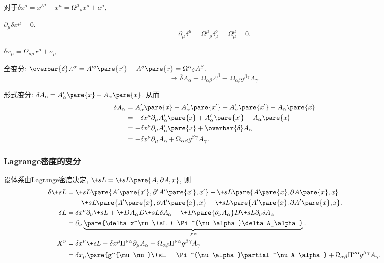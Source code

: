 \documentclass[hidelinks]{ctexart}
\begin{document}
\begin{cenum}
    \item 对于$\delta x^\mu = x'^\mu - x^\mu = {\Omega^\mu}_\rho x^\rho + a^\mu$,
    \begin{cenum}
        \item $\partial_\mu \delta x^\mu = 0$.
        \[ \partial_\mu \delta^\mu = {\Omega^\mu}_\rho \delta^\rho_\mu = \Omega^\mu_\mu  = 0. \]
        \item $\delta x_\mu = \Omega_{\mu\rho}x^\rho + a_\mu$.
    \end{cenum}
    \item 全变分: $\overbar{\delta}A^\alpha = A'^\alpha\pare{x'} - A^\alpha\pare{x} = {\Omega^\alpha}_\beta A^\beta$.
    \[ \Rightarrow \overbar{\delta} A_\alpha = \Omega_{\alpha\beta}A^\beta = \Omega_{\alpha\beta}g^{\beta\gamma}A_\gamma. \]
    \item 形式变分: $\delta A_\alpha = A'_\alpha\pare{x} - A_\alpha\pare{x}$. 从而
    \begin{align*}
        \delta A_\alpha &= A'_\alpha\pare{x} - A'_\alpha\pare{x'} + A'_\alpha\pare{x'} - A_\alpha\pare{x} \\
        &= -\delta x^\mu \partial_\mu A'_\alpha\pare{x} + A'_\alpha\pare{x'} - A_\alpha\pare{x} \\
        &= -\delta x^\mu \partial_\mu A'_\alpha\pare{x} + \overbar{\delta} A_\alpha \\
        &= -\delta x^\mu \partial_\mu A_\alpha + \Omega_{\alpha\beta}g^{\beta\gamma} A_\gamma.
    \end{align*}
\end{cenum}


\subsubsection{Lagrange密度的变分} %
\label{ssub:lagrange密度的变分}

设体系由Lagrange密度决定, $\+sL = \+sL\pare{A,\partial A,x}$, 则
\begin{align*}
    \delta \+sL &= \+sL\pare{A'\pare{x'},\partial'A'\pare{x'},x'} - \+sL\pare{A\pare{x},\partial A\pare{x}, x} \\
    &\phantom{=\,} -\+sL\pare{A'\pare{x},\partial A'\pare{x},x} + \+sL\pare{A'\pare{x},\partial A'\pare{x}, x}. \\
    \delta L &= \delta x^\nu \partial_\nu \+sL + \+D{A_\alpha}D{\+sL}\delta A_\alpha + \+D{\pare{\partial_\nu A_\alpha}}D{\+sL} \partial_\nu \delta A_\alpha \\
    &= \partial_\nu \underbrace{\pare{\delta x^\nu \+sL + \Pi^{\nu \alpha}\delta A_\alpha}}_{X^\alpha}. \\
    X^\nu &= \delta x^\nu \+sL - \delta x^\mu \Pi^{\nu\alpha} \partial_\mu A_\alpha + \Omega_{\alpha\beta} \Pi^{\nu\alpha} g^{\beta\gamma}A_\gamma \\
    &= \delta x_\mu \pare{g^{\mu\nu}\+sL - \Pi^{\nu\alpha}\partial^\nu A_\alpha} + \Omega_{\alpha\beta} \Pi^{\nu\alpha}g^{\beta\gamma}A_\gamma.
\end{align*}



\end{document}
